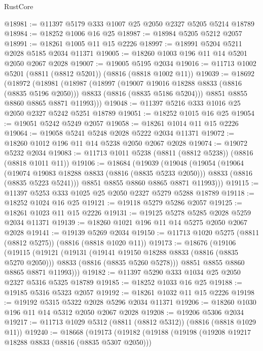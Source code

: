 \begin{lexlean}{RustCore}
\begin{coremodule}
@18981 := @11397 @5179 @333 @1007 @25 @2050 @2327 @5205 @5214 @18789
@18984 := @18252 @1006 @16 @25
@18987 := @18984 @5205 @5212 @2057
@18991 := @18261 @1005 @11 @15 @2226
@18997 := @18991 @5204 @5211 @2028 @5185 @2034 @11371
@19005 := @18260 @1003 @196 @11 @14 @5201 @2050 @2067 @2028
@19007 := @19005 @5195 @2034
@19016 := @11713 @1002 @5201 (@8811 (@8812 @5201)) (@8816 (@8818 @1002 @11))
@19039 := @18692
    (@18972
      (@18981
        (@18987
          (@18997
            (@19007 @19016 @18288 @8833 (@8816 (@8835 @5196 @2050)))
            @8833
            (@8816 (@8835 @5186 @5204)))
          @8851
          @8855
          @8860
          @8865
          @8871
          @11993)))
@19048 := @11397 @5216 @333 @1016 @25 @2050 @2327 @5242 @5251 @18789
@19051 := @18252 @1015 @16 @25
@19054 := @19051 @5242 @5249 @2057
@19058 := @18261 @1014 @11 @15 @2226
@19064 := @19058 @5241 @5248 @2028 @5222 @2034 @11371
@19072 := @18260 @1012 @196 @11 @14 @5238 @2050 @2067 @2028
@19074 := @19072 @5232 @2034
@19083 := @11713 @1011 @5238 (@8811 (@8812 @5238)) (@8816 (@8818 @1011 @11))
@19106 := @18684
    (@19039
      (@19048
        (@19054
          (@19064
            (@19074 @19083 @18288 @8833 (@8816 (@8835 @5233 @2050)))
            @8833
            (@8816 (@8835 @5223 @5241)))
          @8851
          @8855
          @8860
          @8865
          @8871
          @11993)))
@19115 := @11397 @5253 @333 @1025 @25 @2050 @2327 @5279 @5288 @18789
@19118 := @18252 @1024 @16 @25
@19121 := @19118 @5279 @5286 @2057
@19125 := @18261 @1023 @11 @15 @2226
@19131 := @19125 @5278 @5285 @2028 @5259 @2034 @11371
@19139 := @18260 @1021 @196 @11 @14 @5275 @2050 @2067 @2028
@19141 := @19139 @5269 @2034
@19150 := @11713 @1020 @5275 (@8811 (@8812 @5275)) (@8816 (@8818 @1020 @11))
@19173 := @18676
    (@19106
      (@19115
        (@19121
          (@19131
            (@19141 @19150 @18288 @8833 (@8816 (@8835 @5270 @2050)))
            @8833
            (@8816 (@8835 @5260 @5278)))
          @8851
          @8855
          @8860
          @8865
          @8871
          @11993)))
@19182 := @11397 @5290 @333 @1034 @25 @2050 @2327 @5316 @5325 @18789
@19185 := @18252 @1033 @16 @25
@19188 := @19185 @5316 @5323 @2057
@19192 := @18261 @1032 @11 @15 @2226
@19198 := @19192 @5315 @5322 @2028 @5296 @2034 @11371
@19206 := @18260 @1030 @196 @11 @14 @5312 @2050 @2067 @2028
@19208 := @19206 @5306 @2034
@19217 := @11713 @1029 @5312 (@8811 (@8812 @5312)) (@8816 (@8818 @1029 @11))
@19240 := @18668
    (@19173
      (@19182
        (@19188
          (@19198
            (@19208 @19217 @18288 @8833 (@8816 (@8835 @5307 @2050)))

\end{coremodule}
\end{lexlean}
